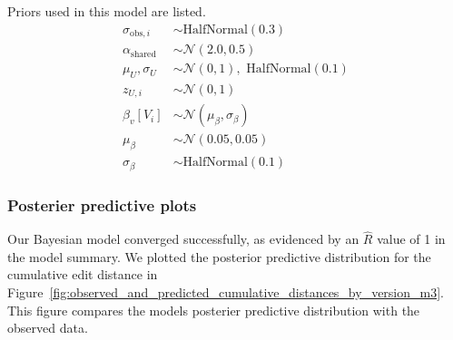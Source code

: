 Priors used in this model are listed.
\begin{align}
    \sigma_{\text{obs},i} &\sim \text{HalfNormal}(0.3) \label{eq:model3_prior_sigma} \\
    \alpha_{\text{shared}} &\sim \mathcal{N}(2.0, 0.5) \label{eq:model3_prior_shared} \\
    \mu_{U}, \sigma_{U} &\sim \mathcal{N}(0, 1), \text{ HalfNormal}(0.1) \label{eq:model3_prior_user} \\
    z_{U,i} &\sim \mathcal{N}(0, 1) \label{eq:model3_prior_z} \\
    \beta_v[V_i] &\sim \mathcal{N}(\mu_{\beta}, \sigma_{\beta}) \label{eq:model3_prior_beta} \\
    \mu_{\beta} &\sim \mathcal{N}(0.05, 0.05) \label{eq:model3_prior_beta_mu}\\
    \sigma_{\beta} &\sim \text{HalfNormal}(0.1) \label{eq:model3_prior_beta_sigma}
\end{align}

\subsubsection{Posterier predictive plots}
Our Bayesian model converged successfully, as evidenced by an $\hat{R}$ value of 1 in the model summary. We plotted the posterior predictive distribution for the cumulative edit distance in Figure~\ref{fig:observed_and_predicted_cumulative_distances_by_version_m3}. This figure compares the models posterier predictive distribution with the observed data.

